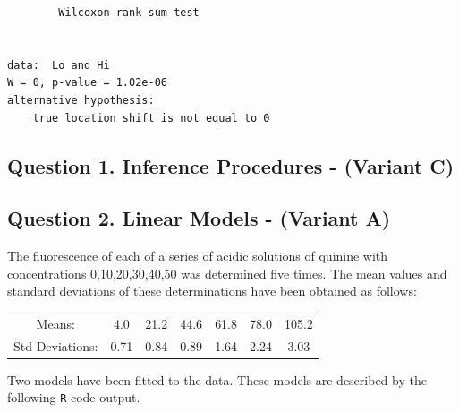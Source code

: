 \documentclass[a4paper,12pt]{article}
\begin{document}
\begin{itemize}
\begin{itemize}
\begin{framed}
\begin{verbatim}
        Wilcoxon rank sum test


data:  Lo and Hi
W = 0, p-value = 1.02e-06
alternative hypothesis: 
	true location shift is not equal to 0

\end{verbatim}
\end{framed}
\end{itemize}

\end{itemize} %


\newpage
\subsection*{Question 1. Inference Procedures - (Variant C) }
\newpage
\subsection*{Question 2. Linear Models - (Variant A) }
	
	
	
	The fluorescence of each of a series of acidic solutions of quinine with concentrations 0,10,20,30,40,50
	was determined five times. The mean values and standard deviations of these determinations have
	been obtained as follows:
	\begin{center}
		\begin{tabular}{|c|cccccc|}
			\hline
			Means: & 4.0 & 21.2& 44.6& 61.8& 78.0 &105.2\\
			Std Deviations: &0.71& 0.84 &0.89 &1.64 &2.24 &3.03\\
			\hline
		\end{tabular}
	\end{center}
	Two models have been fitted to the data. These models are described by the following \texttt{R} code output.
	
	
\end{document}
